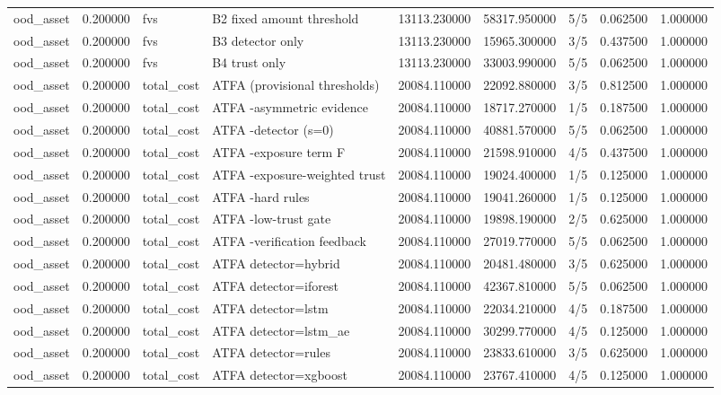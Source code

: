 \begin{tabular}{lrllrrlrr}
ood\_asset & 0.200000 & fvs & B2 fixed amount threshold & 13113.230000 & 58317.950000 & 5/5 & 0.062500 & 1.000000 \\
ood\_asset & 0.200000 & fvs & B3 detector only & 13113.230000 & 15965.300000 & 3/5 & 0.437500 & 1.000000 \\
ood\_asset & 0.200000 & fvs & B4 trust only & 13113.230000 & 33003.990000 & 5/5 & 0.062500 & 1.000000 \\
ood\_asset & 0.200000 & total\_cost & ATFA (provisional thresholds) & 20084.110000 & 22092.880000 & 3/5 & 0.812500 & 1.000000 \\
ood\_asset & 0.200000 & total\_cost & ATFA -asymmetric evidence & 20084.110000 & 18717.270000 & 1/5 & 0.187500 & 1.000000 \\
ood\_asset & 0.200000 & total\_cost & ATFA -detector (s=0) & 20084.110000 & 40881.570000 & 5/5 & 0.062500 & 1.000000 \\
ood\_asset & 0.200000 & total\_cost & ATFA -exposure term F & 20084.110000 & 21598.910000 & 4/5 & 0.437500 & 1.000000 \\
ood\_asset & 0.200000 & total\_cost & ATFA -exposure-weighted trust & 20084.110000 & 19024.400000 & 1/5 & 0.125000 & 1.000000 \\
ood\_asset & 0.200000 & total\_cost & ATFA -hard rules & 20084.110000 & 19041.260000 & 1/5 & 0.125000 & 1.000000 \\
ood\_asset & 0.200000 & total\_cost & ATFA -low-trust gate & 20084.110000 & 19898.190000 & 2/5 & 0.625000 & 1.000000 \\
ood\_asset & 0.200000 & total\_cost & ATFA -verification feedback & 20084.110000 & 27019.770000 & 5/5 & 0.062500 & 1.000000 \\
ood\_asset & 0.200000 & total\_cost & ATFA detector=hybrid & 20084.110000 & 20481.480000 & 3/5 & 0.625000 & 1.000000 \\
ood\_asset & 0.200000 & total\_cost & ATFA detector=iforest & 20084.110000 & 42367.810000 & 5/5 & 0.062500 & 1.000000 \\
ood\_asset & 0.200000 & total\_cost & ATFA detector=lstm & 20084.110000 & 22034.210000 & 4/5 & 0.187500 & 1.000000 \\
ood\_asset & 0.200000 & total\_cost & ATFA detector=lstm\_ae & 20084.110000 & 30299.770000 & 4/5 & 0.125000 & 1.000000 \\
ood\_asset & 0.200000 & total\_cost & ATFA detector=rules & 20084.110000 & 23833.610000 & 3/5 & 0.625000 & 1.000000 \\
ood\_asset & 0.200000 & total\_cost & ATFA detector=xgboost & 20084.110000 & 23767.410000 & 4/5 & 0.125000 & 1.000000 \\

\end{tabular}
